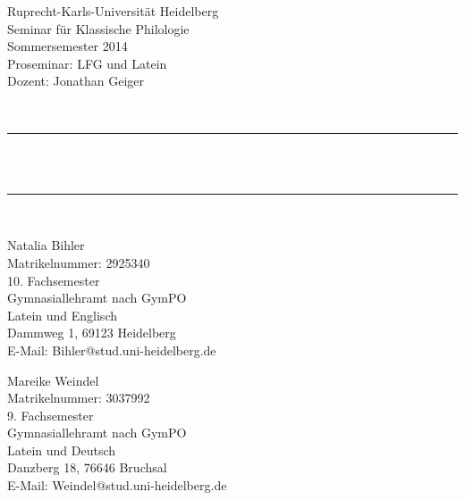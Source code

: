 \begin{titlepage}

\begin{center}


\begin{minipage}{0.55\textwidth}
\begin{flushleft} \small
Ruprecht-Karls-Universität Heidelberg\\
Seminar für Klassische Philologie\\
Sommersemester 2014\\
Proseminar: LFG und Latein \\
Dozent: Jonathan Geiger\\ 
\end{flushleft}
\end{minipage}
\begin{minipage}{0.4\textwidth}
\begin{flushright} \large

\end{flushright}
\end{minipage}
\\[4cm]
\rule{\textwidth}{0.4pt}\\[0.4cm]


 \\[0.1cm]

\rule{\textwidth}{0.4pt}\\[4cm]

\begin{minipage}{0.48\textwidth}
\begin{flushleft} \small
Natalia Bihler\\
Matrikelnummer: 2925340\\
10. Fachsemester\\
Gymnasiallehramt nach GymPO\\
Latein und Englisch\\
Dammweg 1, 69123 Heidelberg\\
E-Mail: Bihler@stud.uni-heidelberg.de
\end{flushleft}
\end{minipage}
\begin{minipage}{0.48\textwidth}
\begin{flushright} \small
Mareike Weindel\\
Matrikelnummer: 3037992\\
9. Fachsemester\\
Gymnasiallehramt nach GymPO\\
Latein und Deutsch\\
Danzberg 18, 76646 Bruchsal\\
E-Mail: Weindel@stud.uni-heidelberg.de
\end{flushright}
\end{minipage}


\end{center}
\end{titlepage}
